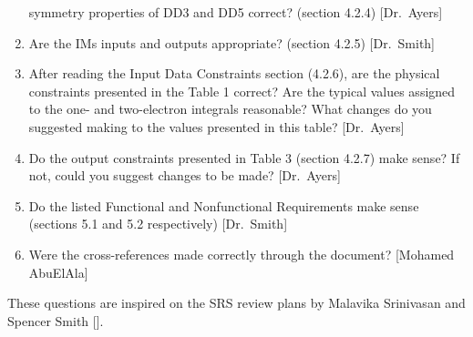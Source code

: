 \documentclass[12pt, titlepage]{article}
\begin{document}
\begin{enumerate}
	symmetry properties of DD3 and DD5 correct? (section 4.2.4) [Dr.\ Ayers]
	\item Are the IMs inputs and outputs appropriate? (section 4.2.5) [Dr.\ 
	Smith]
	\item After reading the Input Data Constraints section (4.2.6), are the 
	physical constraints presented in the Table 1 correct? Are the typical 
	values assigned to the one- and two-electron integrals reasonable? What 
	changes do you suggested making to the values presented in this table? 
	[Dr.\ Ayers]
	\item Do the output constraints presented in Table 3 (section 4.2.7) make 
	sense? If not, could you suggest changes to be made? [Dr.\ Ayers]
	\item Do the listed Functional and Nonfunctional Requirements make sense 
	(sections 5.1 and 5.2 respectively) [Dr.\ Smith]
	\item Were the cross-references made correctly through the document? 
	[Mohamed AbuElAla]
	
\end{enumerate}
These questions are inspired on the SRS review plans by Malavika Srinivasan and 
Spencer Smith [\cite{malavika}]. 
\end{document}
